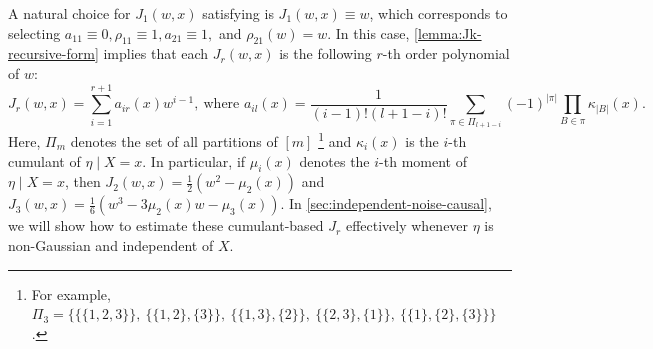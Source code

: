 \documentclass{article}
\newcommand{\textfrac}[2]{{\textstyle\frac{#1}{#2}}}
\begin{document}
A natural choice for $J_1(w,x)$ satisfying  is $J_1(w,x)\equiv w$, which corresponds to selecting $a_{11}\equiv 0, \rho_{11}\equiv 1, a_{21}\equiv 1,$ and $\rho_{21}(w) = w$. 
%
In this case, \cref{lemma:Jk-recursive-form} implies that each $J_r(w,x)$ is the following $r$-th order polynomial of $w$:
\begin{equation}
    \label{eq:poly-Jk}
    J_r(w,x) = \sum_{i=1}^{r+1} a_{ir}(x)w^{i-1} ,\ \text{where } a_{il}(x) = \textfrac{1}{(i-1)!(l+1-i)!} \sum_{\pi\in\Pi_{l+1-i}} (-1)^{|\pi|} \prod_{B\in\pi}\kappa_{|B|}(x).
\end{equation}
Here, $\Pi_m$ denotes the set of all partitions of $[m]$ \footnote{For example, $\Pi_3 = \big\{\{\{1,2,3\}\},\ \{\{1,2\},\{3\}\},\ \{\{1,3\},\{2\}\},\ \{\{2,3\},\{1\}\},\ \{\{1\},\{2\},\{3\}\}\big\}$.} and $\kappa_i(x)$ is the $i$-th cumulant of $\eta\mid X=x$. In particular, if $\mu_i(x)$ denotes the $i$-th moment of $\eta\mid X=x$, then $J_2(w,x) = \frac{1}{2}(w^2 - \mu_2(x))$ and $J_3(w,x) = \frac{1}{6}(w^3 - 3\mu_2(x)w - \mu_3(x))$. 
In \cref{sec:independent-noise-causal}, we will show how to estimate these cumulant-based $J_r$ effectively whenever $\eta$ is non-Gaussian and independent of $X$.


%


%

%
%
%

%

%
%
%
%
%
%
%
%
%
%
%
%
%
%
%
%
%

%
%
%
%
%
%
%
%
%
%
%
%
%
%
%
%
%
%
%
%
%
%
%
%

%

%
%
%
%
%
%
%
%
%
%
%
%
%
%
%
%
%
%
%
%
%
%

%

%
%
%
%
%
%
%
%
%
%
%
%
%
        
%
%
        
%
%
%
%
%
%
%
%
%
%
%
%
%

%

%

%
%

%
%
%
%
%
%
%
%
%
%
%
%
%
%
%
%
%
%

%

%
%

%

%
%
%
%
%
%

%
%
%
%
%

%

%

%
%
%
%

%
\end{document}
